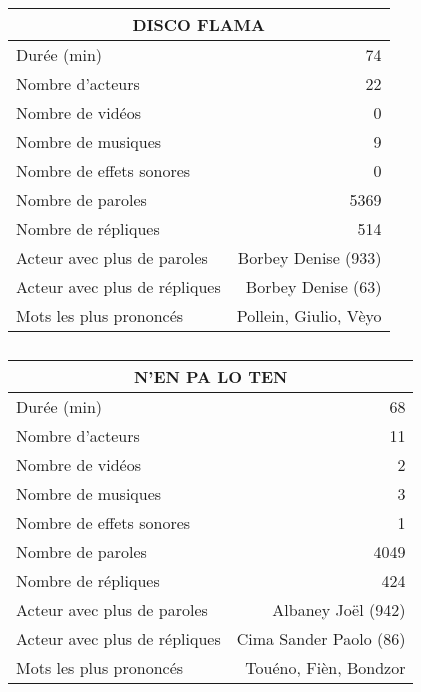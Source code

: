     \begin{table}[]
    \centering
    \caption{}
    \begin{tabular}{lr}\toprule\multicolumn{2}{c}{DISCO FLAMA} \\\midrule
\multicolumn{1}{l}{Durée (min)}&74\\
\multicolumn{1}{l}{Nombre d'acteurs}&22\\
\multicolumn{1}{l}{Nombre de vidéos}&0\\
\multicolumn{1}{l}{Nombre de musiques}&9\\
\multicolumn{1}{l}{Nombre de effets sonores}&0\\
\multicolumn{1}{l}{Nombre de paroles}&5369\\
\multicolumn{1}{l}{Nombre de répliques}&514\\
\multicolumn{1}{l}{Acteur avec plus de paroles}&Borbey Denise (933)\\
\multicolumn{1}{l}{Acteur avec plus de répliques}&Borbey Denise (63)\\
\multicolumn{1}{l}{Mots les plus prononcés}&Pollein, Giulio, Vèyo\\
    \bottomrule
    \end{tabular}%
    \end{table}
    \begin{table}[]
    \centering
    \caption{}
    \begin{tabular}{lr}\toprule\multicolumn{2}{c}{N'EN PA LO TEN} \\\midrule
\multicolumn{1}{l}{Durée (min)}&68\\
\multicolumn{1}{l}{Nombre d'acteurs}&11\\
\multicolumn{1}{l}{Nombre de vidéos}&2\\
\multicolumn{1}{l}{Nombre de musiques}&3\\
\multicolumn{1}{l}{Nombre de effets sonores}&1\\
\multicolumn{1}{l}{Nombre de paroles}&4049\\
\multicolumn{1}{l}{Nombre de répliques}&424\\
\multicolumn{1}{l}{Acteur avec plus de paroles}&Albaney Joël (942)\\
\multicolumn{1}{l}{Acteur avec plus de répliques}&Cima Sander Paolo (86)\\
\multicolumn{1}{l}{Mots les plus prononcés}&Touéno, Fièn, Bondzor\\
    \bottomrule
    \end{tabular}%
    \end{table}
